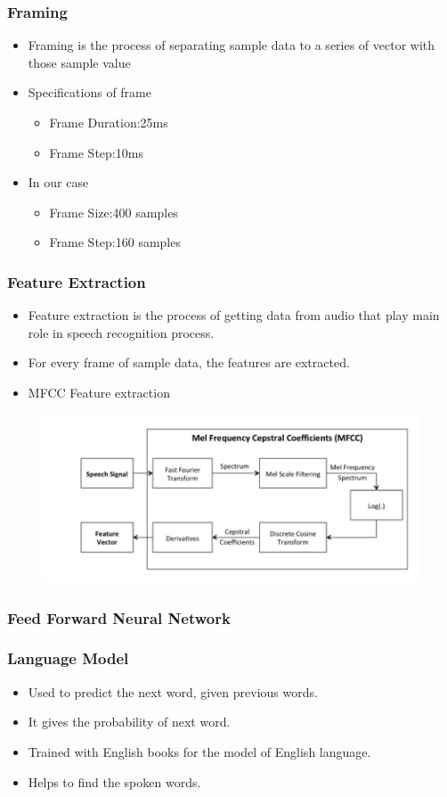 \documentclass[11pt]{beamer}
\begin{document}
\begin{frame}
  \frametitle{Framing}
  \begin{itemize}
  \item Framing is the process of separating sample data to a series of vector with those sample value
  \item Specifications of frame
    \begin{itemize}
    \item{Frame Duration:}25ms
    \item{Frame Step:}10ms
    \end{itemize}
  \item In our case
    \begin{itemize}
    \item{Frame Size:}400 samples
    \item{Frame Step:}160 samples
    \end{itemize}
  \end{itemize}
\end{frame}

\begin{frame}
  \frametitle{Feature Extraction}
\begin{itemize}
\item Feature extraction is the process of getting data from audio that play main role in speech recognition process.
\item For every frame of sample data, the features are extracted.
\item MFCC Feature extraction
\end{itemize}
  \centering
  \begin{figure}[C]
    \centering
    \includegraphics[width=1\textwidth]{../MFCC_Flowchart.png}
  \end{figure}
\end{frame}
\begin{frame}
  \frametitle{Feed Forward Neural Network}
\end{frame}

\begin{frame}
  \frametitle{Language Model}
  \subtitle{NGram Language Model}
  \begin{itemize}
  \item Used to predict the next word, given previous words.
  \item It gives the probability of next word.
  \item Trained with English books for the model of English language.
  \item Helps to find the spoken words.
  \end{itemize}
\end{frame}
\end{document}
